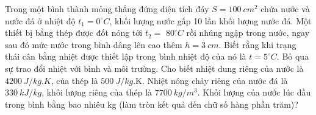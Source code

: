 \begin{vidu} 
	Trong một bình thành mỏng thẳng đứng diện tích đáy $S=100 \ cm^2$ chứa nước và nước đá ở nhiệt độ $t_1=0^\circ C$, khối lượng nước gấp 10 lần khối lượng nước đá. Một thiết bị bằng thép được đốt nóng tới $t_2=$ $80^\circ C$ rồi nhúng ngập trong nước, ngay sau đó mức nước trong bình dâng lên cao thêm $h=3 \ cm$. Biết rằng khi trạng thái cân bằng nhiệt được thiết lập trong bình nhiệt độ của nó là $t=5^\circ C$. Bỏ qua sự trao đổi nhiệt với bình và môi trường. Cho biết nhiệt dung riêng của nước là $4200 \ J / kg . K$, của thép là $500 \ J /kg$.K. Nhiệt nóng chảy riêng của nước đá là $330 \ kJ /kg$, khối lượng riêng của thép là $7700 \ kg / m^3$. Khối lượng của nước lúc đầu trong bình bằng bao nhiêu kg (làm tròn kết quả đến chữ số hàng phần trăm)?
\end{vidu}
